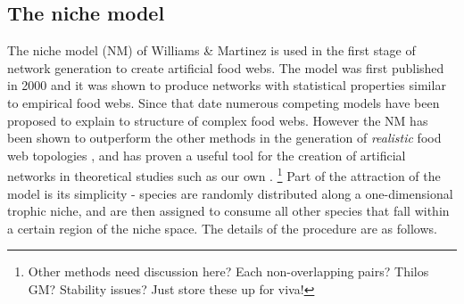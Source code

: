 

\subsection{The niche model}
\label{sec:niche_model}


The niche model (NM) of Williams \& Martinez \cite{williams2000simple} is used in the first stage of network generation to create artificial food webs. The model was first published in 2000 and it was shown to produce networks with statistical properties similar to empirical food webs. Since that date numerous competing models have been proposed \cite{stouffer2005quantitative} to explain to structure of complex food webs. However the NM has been shown to outperform the other methods in the generation of \emph{realistic} food web topologies \cite{williams2008success}, and has proven a useful tool for the creation of artificial networks in theoretical studies such as our own \cite{c2008food,dunne2002food,staniczenko2010structural,lurgi2015effects}. \footnote{Other methods need discussion here? Each non-overlapping pairs? Thilos GM? Stability issues? Just store these up for viva!} Part of the attraction of the model is its simplicity - species are randomly distributed along a one-dimensional trophic niche, and are then assigned to consume all other species that fall within a certain region of the niche space. The details of the procedure are as follows. 

